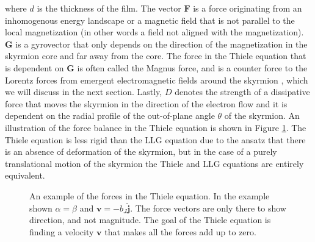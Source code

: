 where $d$ is the thickness of the film. The vector $\mathbold{F}$ is a force originating from an inhomogenous energy landscape or a magnetic field that is not parallel to the local magnetization (in other words a field not aligned with the magnetization). $\mathbold{G}$ is a gyrovector that only depends on the direction of the magnetization in the skyrmion core and far away from the core. The force in the Thiele equation that is dependent on $\mathbold{G}$ is often called the Magnus force, and is a counter force to the Lorentz forces from emergent electromagnetic fields around the skyrmion \cite{Everschor-Sitte2014}, which we will discuss in the next section. Lastly, $D$ denotes the strength of a dissipative force that moves the skyrmion in the direction of the electron flow and it is dependent on the radial profile of the out-of-plane angle $\theta$ of the skyrmion. An illustration of the force balance in the Thiele equation is shown in Figure \ref{fig:Thiele}. The Thiele equation is less rigid than the LLG equation due to the ansatz that there is an absence of deformation of the skyrmion, but in the case of a purely translational motion of the skyrmion the Thiele and LLG equations are entirely equivalent.
\begin{figure}[h!]
\centering
  \centering
\caption{An example of the forces in the Thiele equation. In the example shown $\alpha=\beta$ and $\mathbold{v}=-b_J\mathbold{\hat{j}}$. The force vectors are only there to show direction, and not magnitude. The goal of the Thiele equation is finding a velocity $\mathbold{v}$ that makes all the forces add up to zero.}
\label{fig:Thiele}
\end{figure}

